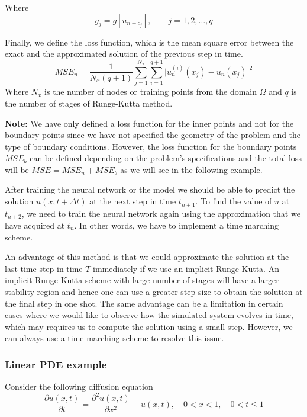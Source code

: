 \documentclass[a4paper,12pt]{article}
\theoremstyle{definition}
\begin{document}
Where 
$$g_j = g[u_{n+c_j}], \qquad  j = 1, 2, \dots, q$$

Finally, we define the loss function, which is the mean square error between the exact and the approximated 
solution of the previous step in time.
\begin{equation}
MSE_{n} = \frac{1}{N_x (q+1)} \sum_{j=1}^{N_x} \sum_{i=1}^{q+1} \Big| u_n^{(i)}(x_j) - u_n(x_j) \Big|^2
\end{equation}
Where $N_x$ is the number of nodes or training points from the domain $\Omega$ and $q$ is the number 
of stages of Runge-Kutta method.

\textbf{Note:} We have only defined a loss function for the inner points and not for the boundary
points since we have not specified the geometry of the problem and the type of boundary conditions.
However, the loss function for the boundary points $MSE_b$ can be defined depending on 
the problem's specifications and the total loss will be $MSE = MSE_n + MSE_b$ as we will see in the following 
example.  

After training the neural network or the model we should be able to predict the solution $u(x, t + \Delta t)$
at the next step in time $t_{n+1}$. To find the value of $u$ at $t_{n+2}$, we need to train the neural network
again using the approximation that we have acquired at $t_{n}$. In other words, we have to implement a time marching 
scheme. 

An advantage of this method is that we could approximate the solution at the last time step in time $T$ immediately
if we use an implicit Runge-Kutta. An implicit Runge-Kutta scheme with large number of stages will have a larger 
stability region and hence one can use a greater step size to obtain the solution at the final step in one shot. 
The same advantage can be a limitation in certain cases where we would like to observe how the simulated system 
evolves in time, which may requires us to compute the solution using a small step.
However, we can always use a time marching scheme to resolve this issue.

\subsubsection{Linear PDE example}
Consider the following diffusion equation 
\begin{equation}\label{diffusion_discrete_time}
\frac{\partial u(x,t)}{\partial t} = \frac{\partial^2 u(x,t)}{\partial x^2} - u(x, t),
\quad 0 < x < 1, \quad 0 < t  \le 1
\end{equation}
\end{document}
